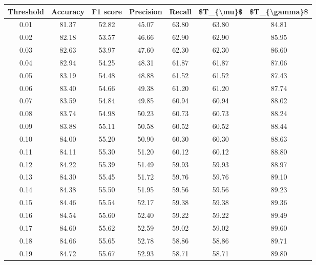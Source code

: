 \begin{tabular}{|c|c|c|c|c|c|c|}
\hline
 Threshold &  Accuracy &  F1 score &  Precision &  Recall &  \$T\_\{\textbackslash mu\}\$ &  \$T\_\{\textbackslash gamma\}\$ \\
\hline
      0.01 &     81.37 &     52.82 &      45.07 &   63.80 &      63.80 &         84.81 \\
      0.02 &     82.18 &     53.57 &      46.66 &   62.90 &      62.90 &         85.95 \\
      0.03 &     82.63 &     53.97 &      47.60 &   62.30 &      62.30 &         86.60 \\
      0.04 &     82.94 &     54.25 &      48.31 &   61.87 &      61.87 &         87.06 \\
      0.05 &     83.19 &     54.48 &      48.88 &   61.52 &      61.52 &         87.43 \\
      0.06 &     83.40 &     54.66 &      49.38 &   61.20 &      61.20 &         87.74 \\
      0.07 &     83.59 &     54.84 &      49.85 &   60.94 &      60.94 &         88.02 \\
      0.08 &     83.74 &     54.98 &      50.23 &   60.73 &      60.73 &         88.24 \\
      0.09 &     83.88 &     55.11 &      50.58 &   60.52 &      60.52 &         88.44 \\
      0.10 &     84.00 &     55.20 &      50.90 &   60.30 &      60.30 &         88.63 \\
      0.11 &     84.11 &     55.30 &      51.20 &   60.12 &      60.12 &         88.80 \\
      0.12 &     84.22 &     55.39 &      51.49 &   59.93 &      59.93 &         88.97 \\
      0.13 &     84.30 &     55.45 &      51.72 &   59.76 &      59.76 &         89.10 \\
      0.14 &     84.38 &     55.50 &      51.95 &   59.56 &      59.56 &         89.23 \\
      0.15 &     84.46 &     55.54 &      52.17 &   59.38 &      59.38 &         89.36 \\
      0.16 &     84.54 &     55.60 &      52.40 &   59.22 &      59.22 &         89.49 \\
      0.17 &     84.60 &     55.62 &      52.59 &   59.02 &      59.02 &         89.60 \\
      0.18 &     84.66 &     55.65 &      52.78 &   58.86 &      58.86 &         89.71 \\
      0.19 &     84.72 &     55.67 &      52.93 &   58.71 &      58.71 &         89.80 \\

\end{tabular}
